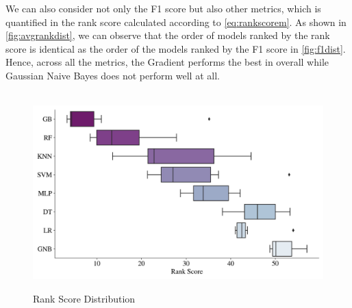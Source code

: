 \newpage
We can also consider not only the F1 score but also other metrics, which is quantified in the rank score calculated according to \autoref{eq:rankscorem}. As shown in \autoref{fig:avgrankdist}, we can observe that the order of models ranked by the rank score is identical as the order of the models ranked by the F1 score in \autoref{fig:f1dist}.
Hence, across all the metrics, the Gradient performs the best in overall while Gaussian Naive Bayes does not perform well at all.
\begin{figure}[H]
    \centering
    \caption{Rank Score Distribution}\vspace{0.5em}
    \label{fig:avgrankdist}\
    \includegraphics[width=140mm]{Figures/AVG_RANK_Distribution.jpg}

    \vspace{-1em}
\end{figure}

